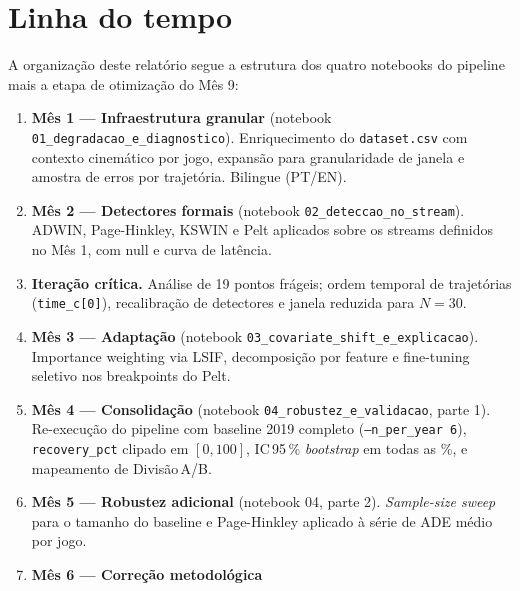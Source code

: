\documentclass[11pt,a4paper]{article}
\begin{document}

\section{Linha do tempo}

A organiza\c{c}\~ao deste relat\'orio segue a estrutura dos quatro
notebooks do pipeline mais a etapa de otimiza\c{c}\~ao do M\^es 9:

\begin{enumerate}[leftmargin=2em,itemsep=2pt]
    \item \textbf{M\^es 1 --- Infraestrutura granular} (notebook
          \texttt{01\_degradacao\_e\_diagnostico}).
          Enriquecimento do \texttt{dataset.csv} com contexto cinem\'atico
          por jogo, expans\~ao para granularidade de janela e amostra de
          erros por trajet\'oria. Bilingue (PT/EN).
    \item \textbf{M\^es 2 --- Detectores formais} (notebook
          \texttt{02\_deteccao\_no\_stream}).
          ADWIN, Page-Hinkley, KSWIN e Pelt aplicados sobre os streams
          definidos no M\^es 1, com null e curva de lat\^encia.
    \item \textbf{Itera\c{c}\~ao cr\'itica.} An\'alise de 19 pontos
          fr\'ageis; ordem temporal de trajet\'orias (\texttt{time\_c[0]}),
          recalibra\c{c}\~ao de detectores e janela reduzida para
          $N{=}30$.
    \item \textbf{M\^es 3 --- Adapta\c{c}\~ao} (notebook
          \texttt{03\_covariate\_shift\_e\_explicacao}).
          Importance weighting via LSIF, decomposi\c{c}\~ao por feature
          e fine-tuning seletivo nos breakpoints do Pelt.
    \item \textbf{M\^es 4 --- Consolida\c{c}\~ao} (notebook
          \texttt{04\_robustez\_e\_validacao}, parte 1).
          Re-execu\c{c}\~ao do pipeline com baseline 2019 completo
          (\texttt{--n\_per\_year 6}), \texttt{recovery\_pct} clipado em
          $[0,100]$, IC\,95\,\% \emph{bootstrap} em todas as \%, e
          mapeamento de Divis\~ao\,A/B.
    \item \textbf{M\^es 5 --- Robustez adicional} (notebook 04, parte 2).
          \emph{Sample-size sweep} para o tamanho do baseline e
          Page-Hinkley aplicado \`a s\'erie de ADE m\'edio por jogo.
    \item \textbf{M\^es 6 --- Corre\c{c}\~ao metodol\'ogica}

\end{enumerate}
\end{document}
